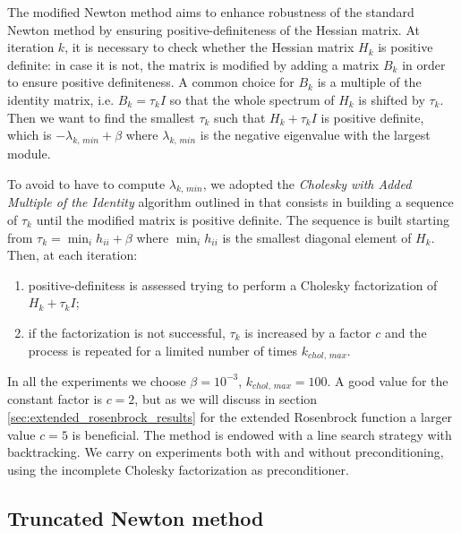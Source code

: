 The modified Newton method aims to enhance robustness of the standard Newton method by ensuring positive-definiteness of the Hessian matrix.
At iteration $k$, it is necessary to check whether the Hessian matrix $H_k$ is positive definite: in case it is not, the matrix is modified by adding a matrix $B_k$ in order to ensure positive definiteness.
A common choice for $B_k$ is a multiple of the identity matrix, i.e. $B_k = \tau_k I$ so that the whole spectrum of $H_k$ is shifted by $\tau_k$.
Then we want to find the smallest $\tau_k$ such that $H_k + \tau_k I$ is positive definite, which is $-\lambda_{k,\,min} + \beta$ where $\lambda_{k,\,min}$ is the negative eigenvalue with the largest module.

To avoid to have to compute $\lambda_{k,\,min}$, we adopted the \textit{Cholesky with Added Multiple of the Identity} algorithm outlined in \cite{nocedal-optimization} that consists in building a sequence of $\tau_k$ until the modified matrix is positive definite.
The sequence is built starting from $\tau_k = \min_i h_{ii} + \beta$ where $\min_i h_{ii}$ is the smallest diagonal element of $H_k$.
Then, at each iteration:
\begin{enumerate}
\item positive-definitess is assessed trying to perform a Cholesky factorization of $H_k + \tau_k I$;
\item if the factorization is not successful, $\tau_k$ is increased by a factor $c$ and the process is repeated for a limited number of times $k_{chol,\,max}$.
\end{enumerate}
In all the experiments we choose $\beta = 10^{-3}$, $k_{chol,\,max} = 100$.
A good value for the constant factor is $c=2$, but as we will discuss in section \ref{sec:extended_rosenbrock_results} for the extended Rosenbrock function a larger value $c=5$ is beneficial.
The method is endowed with a line search strategy with backtracking.
We carry on experiments both with and without preconditioning, using the incomplete Cholesky factorization as preconditioner.

\subsection{Truncated Newton method}

